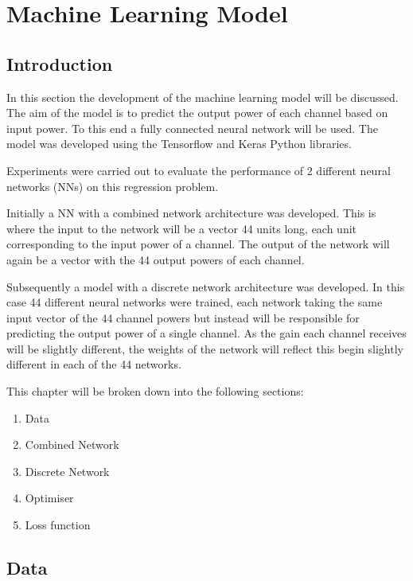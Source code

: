 


\newpage
\section{Machine Learning Model}\label{tw:ml_model}


\subsection{Introduction}
In this section the development of the machine learning model will be discussed. The aim of the model is to predict the output power of each channel based on input power. To this end a fully connected neural network will be used. The model was developed using the Tensorflow and Keras Python libraries.

Experiments were carried out to evaluate the performance of 2 different neural networks (NNs) on this regression problem.

Initially a NN with a combined network architecture was developed. This is where the input to the network will be a vector 44 units long, each unit corresponding to the input power of a channel. The output of the network will again be a vector with the 44 output powers of each channel.

Subsequently a model with a discrete network architecture was developed. In this case 44 different neural networks were trained, each network taking the same input vector of the 44 channel powers but instead will be responsible for predicting the output power of a single channel. As the gain each channel receives will be slightly different, the weights of the network will reflect this begin slightly different in each of the 44 networks.


This chapter will be broken down into the following sections:
\begin{enumerate}
    \item Data
    \item Combined Network
    \item Discrete Network
    \item Optimiser
    \item Loss function
\end{enumerate}

\subsection{Data}\label{subsec:ml_model:data}
\FloatBarrier

